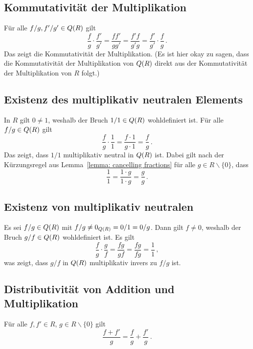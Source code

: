 \subsection*{Kommutativität der Multiplikation}

Für alle $f/g, f'/g' \in Q(R)$ gilt
\[
    \frac{f}{g} \cdot \frac{f'}{g'}
  = \frac{f f'}{g g'}
  = \frac{f' f}{g' g}
  = \frac{f'}{g'} \cdot \frac{f}{g} \,.
\]
Das zeigt die Kommutativität der Multiplikation.
(Es ist hier okay zu sagen, dass die Kommutativität der Multiplikation von $Q(R)$ direkt aus der Kommutativität der Multiplikation von $R$ folgt.)





\subsection*{Existenz des multiplikativ neutralen Elements}

In $R$ gilt $0 \neq 1$, weshalb der Bruch $1/1 \in Q(R)$ wohldefiniert ist.
Für alle $f/g \in Q(R)$ gilt
\[
    \frac{f}{g} \cdot \frac{1}{1}
  = \frac{f \cdot 1}{g \cdot 1}
  = \frac{f}{g} \,.
\]
Das zeigt, dass $1/1$ multiplikativ neutral in $Q(R)$ ist.
Dabei gilt nach der Kürzungsregel aus Lemma~\ref{lemma: cancelling fractions} für alle $g \in R \smallsetminus \{0\}$, dass
\[
    \frac{1}{1}
  = \frac{1 \cdot g}{1 \cdot g}
  = \frac{g}{g} \,.
\]





\subsection*{Existenz von multiplikativ neutralen}

Es sei $f/g \in Q(R)$ mit $f/g \neq 0_{Q(R)} = 0/1 = 0/g$.
Dann gilt $f \neq 0$, weshalb der Bruch $g/f \in Q(R)$ wohldefiniert ist.
Es gilt
\[
    \frac{f}{g} \cdot \frac{g}{f}
  = \frac{fg}{gf}
  = \frac{fg}{fg}
  = \frac{1}{1} \,,
\]
was zeigt, dass $g/f$ in $Q(R)$ multiplikativ invers zu $f/g$ ist.





\subsection*{Distributivität von Addition und Multiplikation}

\begin{lemma}
  Für alle $f, f' \in R$, $g \in R \smallsetminus \{0\}$ gilt
  \[
    \frac{f + f'}{g} = \frac{f}{g} + \frac{f'}{g} \,.
  \]
\end{lemma}

